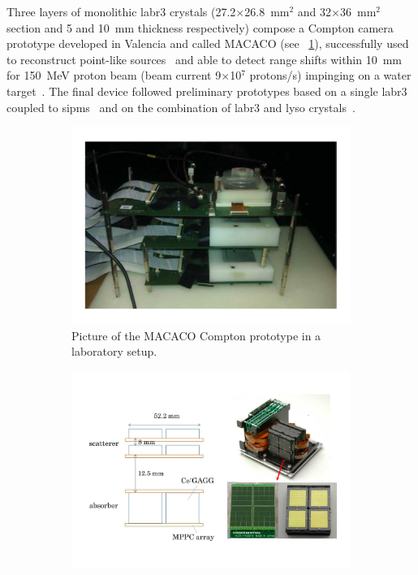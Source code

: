 Three layers of monolithic \gls{labr3} crystals (27.2$\times$26.8~mm$^2$ and 32$\times$36~mm$^2$ section and 5 and 10~mm thickness respectively) compose a Compton camera prototype developed in Valencia and called MACACO (see \figurename~\ref{chap2::fig::CC_MACACO}), successfully used to reconstruct point-like sources~\parencite{Llosa2016} and able to detect range shifts within 10~mm for 150~MeV proton beam (beam current 9$\times$10$^7$ protons/s) impinging on a water target~\parencite{Solevi2016}. The final device followed preliminary prototypes based on a single \gls{labr3} coupled to \glspl{sipm}~\parencite{Llosa2012} and on the combination of \gls{labr3} and \gls{lyso} crystals~\parencite{Llosa2013}.

\begin{figure}
\centering
\begin{subfigure}[t]{.49\textwidth}
\hspace{-0.7cm}\includegraphics[width=1.2\linewidth]{03_GraphicFiles/chapter2_GammaCameras/MACACO.pdf}
\caption{Picture of the MACACO Compton prototype in a laboratory setup.}
\label{chap2::fig::CC_MACACO}
\end{subfigure}
\begin{subfigure}[t]{.49\textwidth}
\hspace{-0.7cm}\includegraphics[width=1.2\linewidth]{03_GraphicFiles/chapter2_GammaCameras/HandheldCC.pdf}

\end{subfigure}
\end{figure}
